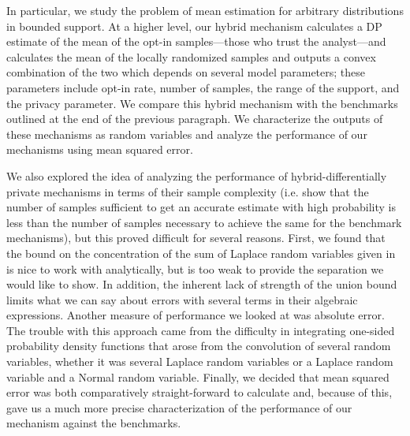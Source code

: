 \documentclass{article}
\theoremstyle{plain}
\begin{document}
In particular, we study the problem of mean estimation for arbitrary distributions in bounded support. At a higher level, our hybrid mechanism calculates a DP estimate of the mean of the opt-in samples—those who trust the analyst—and calculates the mean of the locally randomized samples and outputs a convex combination of the two which depends on several model parameters; these parameters include opt-in rate, number of samples, the range of the support, and the privacy parameter. We compare this hybrid mechanism with the benchmarks outlined at the end of the previous paragraph. We characterize the outputs of these mechanisms as random variables and analyze the performance of our mechanisms using mean squared error. 

We also explored the idea of analyzing the performance of hybrid-differentially private mechanisms in terms of their sample complexity (i.e. show that the number of samples sufficient to get an accurate estimate with high probability is less than the number of samples necessary to achieve the same for the benchmark mechanisms), but this proved difficult for several reasons. First, we found that the bound on the concentration of the sum of Laplace random variables given in \cite{Chan:2011:PCR:2043621.2043626} is nice to work with analytically, but is too weak to provide the separation we would like to show. In addition, the inherent lack of strength of the union bound limits what we can say about errors with several terms in their algebraic expressions. Another measure of performance we looked at was absolute error. The trouble with this approach came from the difficulty in integrating one-sided probability density functions that arose from the convolution of several random variables, whether it was several Laplace random variables or a Laplace random variable and a Normal random variable. Finally, we decided that mean squared error was both comparatively straight-forward to calculate and, because of this, gave us a much more precise characterization of the performance of our mechanism against the benchmarks. 
\end{document}
